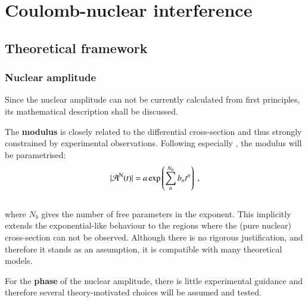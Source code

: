 \section{Coulomb-nuclear interference}


\subsection{Theoretical framework}
\label{sec:cni_framework}


\subsubsection{Nuclear amplitude}

Since the nuclear amplitude can not be currently calculated from first principles, its mathematical description shall be discussed.

The {\bf modulus} is closely related to the differential cross-section and thus strongly constrained by experimental observations. Following especially \cite{8tev-90m}, the modulus will be parametrised:
\begin{equation}
\label{eq:nuc mod}
| {\cal A}^{\rm N}(t) | = a \exp\left( \sum\limits_{n}^{N_b} b_n t^n \right)\ ,
\end{equation}
\\
where $N_b$ gives the number of free parameters in the exponent. This implicitly extends the exponential-like behaviour to the regions where the (pure nuclear) cross-section can not be observed. Although there is no rigorous justification, and therefore it stands as an assumption, it is compatible with many theoretical models.

For the {\bf phase} of the nuclear amplitude, there is little experimental guidance and therefore several theory-motivated choices will be assumed and tested.

